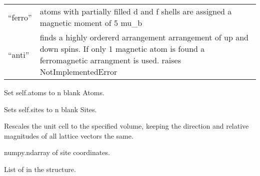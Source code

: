 \documentclass[letterpaper,10pt,english]{sphinxmanual}
\begin{document}
\begin{fulllineitems}
\begin{fulllineitems}
\begin{tabulary}{\linewidth}{|L|L|}
``ferro''
 & 
atoms with partially filled d and
f shells are assigned a magnetic
moment of 5 mu\_b
\\

``anti''
 & 
finds a highly ordererd arrangement
arrangement of up and down spins.
If only 1 magnetic atom is found
a ferromagnetic arrangment is used.
raises NotImplementedError
\\
\hline\end{tabulary}


\end{fulllineitems}


\begin{fulllineitems}
\label{models:qmpy.Structure.set_natoms}
Set self.atoms to n blank Atoms.

\end{fulllineitems}


\begin{fulllineitems}
\label{models:qmpy.Structure.set_nsites}
Sets self.sites to n blank Sites.

\end{fulllineitems}


\begin{fulllineitems}
\label{models:qmpy.Structure.set_volume}
Rescales the unit cell to the specified volume, keeping the direction
and relative magnitudes of all lattice vectors the same.

\end{fulllineitems}


\begin{fulllineitems}
\label{models:qmpy.Structure.site_coords}
numpy.ndarray of site coordinates.

\end{fulllineitems}


\begin{fulllineitems}
\label{models:qmpy.Structure.sites}
List of  in the structure.


\end{fulllineitems}
\end{fulllineitems}
\end{document}
